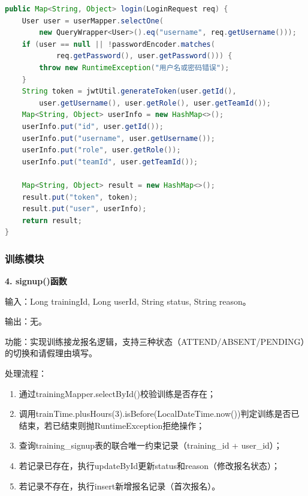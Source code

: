 \documentclass[12pt,a4paper]{ctexart}
\begin{document}
\begin{lstlisting}[language=Java]
public Map<String, Object> login(LoginRequest req) {
    User user = userMapper.selectOne(
        new QueryWrapper<User>().eq("username", req.getUsername()));
    if (user == null || !passwordEncoder.matches(
            req.getPassword(), user.getPassword())) {
        throw new RuntimeException("用户名或密码错误");
    }
    String token = jwtUtil.generateToken(user.getId(),
        user.getUsername(), user.getRole(), user.getTeamId());
    Map<String, Object> userInfo = new HashMap<>();
    userInfo.put("id", user.getId());
    userInfo.put("username", user.getUsername());
    userInfo.put("role", user.getRole());
    userInfo.put("teamId", user.getTeamId());

    Map<String, Object> result = new HashMap<>();
    result.put("token", token);
    result.put("user", userInfo);
    return result;
}
\end{lstlisting}

\subsubsection{训练模块}

\textbf{4. signup()函数}

输入：Long trainingId, Long userId, String status, String reason。

输出：无。

功能：实现训练接龙报名逻辑，支持三种状态（ATTEND/ABSENT/PENDING）的切换和请假理由填写。

处理流程：
\begin{enumerate}[label=(\arabic*)]
\item 通过trainingMapper.selectById()校验训练是否存在；
\item 调用trainTime.plusHours(3).isBefore(LocalDateTime.now())判定训练是否已结束，若已结束则抛RuntimeException拒绝操作；
\item 查询training\_signup表的联合唯一约束记录（training\_id + user\_id）；
\item 若记录已存在，执行updateById更新status和reason（修改报名状态）；
\item 若记录不存在，执行insert新增报名记录（首次报名）。
\end{enumerate}
\end{document}
